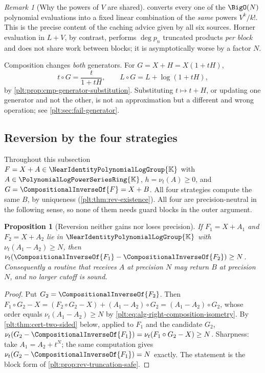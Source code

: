 \documentclass[11pt,oneside]{article}
\theoremstyle{plain}
\newtheorem{proposition}[theorem]{Proposition}
\theoremstyle{definition}
\theoremstyle{remark}
\newtheorem{remark}[theorem]{Remark}
\newcommand{\K}{\mathbb{K}}
\newcommand{\PLpow}{\PolynomialLogPowerSeriesRing{\K}}   %
\newcommand{\Gnear}{\NearIdentityPolynomialLogGroup{\K}} %
\newcommand{\ordt}{\nu_{t}}                              %
\newcommand{\compose}{\mathbin{\circ}}
\newcommand{\rev}[1]{\CompositionalInverseOf{#1}}
\begin{document}
\begin{remark}[Why the powers of \(V\) are shared]
 converts every one of the \(\BigO(N)\) polynomial
evaluations into a fixed linear combination of the \emph{same} powers
\(V^k/k!\).  This is the precise content of the caching advice given by all six
sources.  Horner evaluation in \(L+V\), by contrast, performs
\(\deg p_n\) truncated products \emph{per block} and does not share work
between blocks; it is asymptotically worse by a factor \(N\).
\end{remark}

\begin{warningbox}
Composition changes \emph{both} generators.  For \(G=X+H=X(1+tH)\),
\[
 t\compose G=\frac{t}{1+tH},
 \qquad
 L\compose G=L+\log(1+tH),
\]
by \cref{plt:prop:cmp-generator-substitution}.  Substituting \(t\mapsto t+H\),
or updating one generator and not the other, is not an approximation but a
different and wrong operation; see \cref{plt:sec:fail-generator}.
\end{warningbox}

\subsection{Reversion by the four strategies}
\label{plt:sec:alg-reversion}

Throughout this subsection \(F=X+A\in\Gnear\) with \(A\in\PLpow\),
\(h=\ordt(A)\ge0\), and \(G=\rev{F}=X+B\).  All four strategies compute the
same \(B\), by uniqueness (\cref{plt:thm:rev-existence}).  All four are
precision-neutral in the following sense, so none of them needs guard blocks in
the outer argument.

\begin{proposition}[Reversion neither gains nor loses precision]
\label{plt:prop:alg-reversion-precision}
If \(F_1=X+A_1\) and \(F_2=X+A_2\) lie in \(\Gnear\) with
\(\ordt(A_1-A_2)\ge N\), then \(\ordt(\rev{F_1}-\rev{F_2})\ge N\).
Consequently a routine that receives \(A\) at precision \(N\) may return
\(B\) at precision \(N\), and no larger cutoff is sound.
\end{proposition}

\begin{proof}
Put \(G_2=\rev{F_2}\).  Then
\(F_1\compose G_2-X=(F_2\compose G_2-X)+(A_1-A_2)\compose G_2
=(A_1-A_2)\compose G_2\), whose order equals \(\ordt(A_1-A_2)\ge N\) by
\cref{plt:eq:alg-right-composition-isometry}.  By
\cref{plt:thm:cert-two-sided} below, applied to \(F_1\) and the candidate
\(G_2\),
\(\ordt(G_2-\rev{F_1})=\ordt(F_1\compose G_2-X)\ge N\).  Sharpness: take
\(A_1=A_2+t^{N}\); the same computation gives
\(\ordt(G_2-\rev{F_1})=N\) exactly.  The statement is the block form of
\cref{plt:prop:rev-truncation-safe}.
\end{proof}
\end{document}
